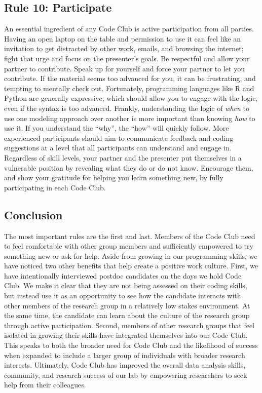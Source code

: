 \documentclass[
  11pt,
]{article}
\begin{document}
\hypertarget{rule-10-participate}{%
\subsection{Rule 10: Participate}\label{rule-10-participate}}

An essential ingredient of any Code Club is active participation from
all parties. Having an open laptop on the table and permission to use it
can feel like an invitation to get distracted by other work, emails, and
browsing the internet; fight that urge and focus on the presenter's
goals. Be respectful and allow your partner to contribute. Speak up for
yourself and force your partner to let you contribute. If the material
seems too advanced for you, it can be frustrating, and tempting to
mentally check out. Fortunately, programming languages like R and Python
are generally expressive, which should allow you to engage with the
logic, even if the syntax is too advanced. Frankly, understanding the
logic of \emph{when} to use one modeling approach over another is more
important than knowing \emph{how} to use it. If you understand the
``why'', the ``how'' will quickly follow. More experienced participants
should aim to communicate feedback and coding suggestions at a level
that all participants can understand and engage in. Regardless of skill
levels, your partner and the presenter put themselves in a vulnerable
position by revealing what they do or do not know. Encourage them, and
show your gratitude for helping you learn something new, by fully
participating in each Code Club.

\hypertarget{conclusion}{%
\subsection{Conclusion}\label{conclusion}}

The most important rules are the first and last. Members of the Code
Club need to feel comfortable with other group members and sufficiently
empowered to try something new or ask for help. Aside from growing in
our programming skills, we have noticed two other benefits that help
create a positive work culture. First, we have intentionally interviewed
postdoc candidates on the days we hold Code Club. We make it clear that
they are not being assessed on their coding skills, but instead use it
as an opportunity to see how the candidate interacts with other members
of the research group in a relatively low stakes environment. At the
same time, the candidate can learn about the culture of the research
group through active participation. Second, members of other research
groups that feel isolated in growing their skills have integrated
themselves into our Code Club. This speaks to both the broader need for
Code Club and the likelihood of success when expanded to include a
larger group of individuals with broader research interests. Ultimately,
Code Club has improved the overall data analysis skills, community, and
research success of our lab by empowering researchers to seek help from
their colleagues.
\end{document}
